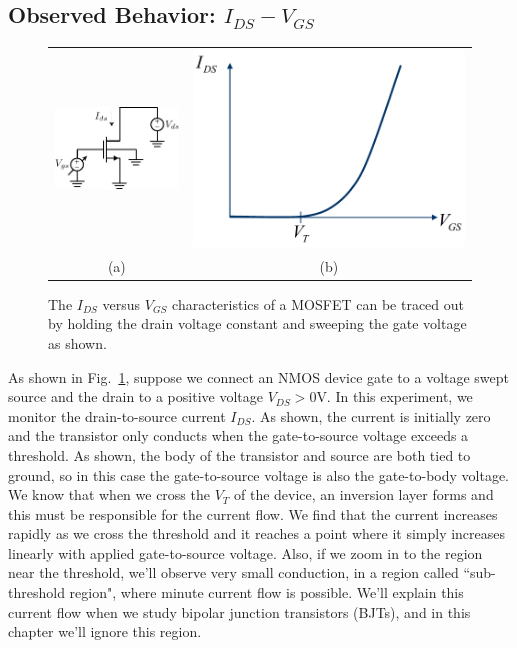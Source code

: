 \subsection{Observed Behavior: \texorpdfstring{$I_{DS}-V_{GS}$}{Drain Current vs. Gate Voltage}}
\begin{figure}[tb]
\centering
\begin{tabular}{cc}
\includegraphics[width=.35\columnwidth]{idvgs_sweep} &
\includegraphics[width=.55\columnwidth]{mos_ids_vgs}\\
(a) & (b)\\
\end{tabular}
\caption{The $I_{DS}$ versus $V_{GS}$ characteristics of a MOSFET can be traced out by holding the drain voltage constant and sweeping the gate voltage as shown.}
\label{fig:idvgs_sweep}
\end{figure}
As shown in Fig.~\ref{fig:idvgs_sweep}, suppose we connect an NMOS device gate to a voltage swept source and the drain to a positive voltage $V_{DS} > 0$V.  In this experiment, we monitor the drain-to-source current $I_{DS}$.  As shown, the current is initially zero and the transistor only conducts when the gate-to-source voltage exceeds a threshold.  As shown, the body of the transistor and source are both tied to ground, so in this case the gate-to-source voltage is also the gate-to-body voltage.  We know that when we cross the $V_T$ of the device, an inversion layer forms and this must be responsible for the current flow.
We find that the current increases rapidly as we cross the threshold and it reaches a point where it simply increases linearly with applied gate-to-source voltage.  Also, if we zoom in to the region near the threshold, we'll observe very small conduction, in a region called ``sub-threshold region", where minute current flow is possible.  We'll explain this current flow when we study bipolar junction transistors (BJTs), and in this chapter we'll ignore this region.  

